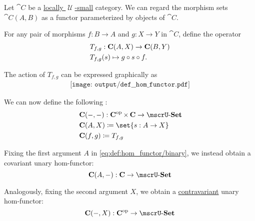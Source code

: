 \begin{definition}\label{def:hom_functor}
  Let \( \cat{C} \) be a \hyperref[def:category_size]{locally \( \mscrU \)-small} category. We can regard the morphism sets \( \cat{C}(A, B) \) as a functor parameterized by objects of \( \cat{C} \).

  \begin{thmenum}
     For any pair of morphisms \( f: B \to A \) and \( g: X \to Y \) in \( \cat{C} \), define the operator
    \begin{equation}\label{eq:def:hom_functor/t}
      \begin{aligned}
        &T_{f,g}: \cat{C}(A, X) \to \cat{C}(B, Y) \\
        &T_{f,g}(s) \mapsto g \bincirc s \bincirc f.
      \end{aligned}
    \end{equation}

    The action of \( T_{f,g} \) can be expressed graphically as
    \begin{equation}\label{eq:def:hom_functor/t_diagram}
      \begin{aligned}
        \texttt{[image: output/def\_\_hom\_functor.pdf]}
      \end{aligned}
    \end{equation}

    We can now define the following :
    \begin{equation}\label{eq:def:hom_functor/binary}
      \begin{aligned}
        &\cat{C}(\anon*, \anon*): \cat{C}^{\opcat} \times \cat{C} \to \ucat{Set} \\
        &\cat{C}(A, X) \coloneqq \set{ s: A \to X } \\
        &\cat{C}(f, g) \coloneqq T_{f,g}
      \end{aligned}
    \end{equation}

     Fixing the first argument \( A \) in \eqref{eq:def:hom_functor/binary}, we instead obtain a covariant unary hom-functor:
    \begin{equation}\label{eq:def:hom_functor/unary/covariant}
      \cat{C}(A, \anon*): \cat{C} \to \ucat{Set}
    \end{equation}

    Analogously, fixing the second argument \( X \), we obtain a \hyperref[def:hom_functor/unary]{contravariant} unary hom-functor:
    \begin{equation}\label{eq:def:hom_functor/unary/contravariant}
      \cat{C}(\anon*, X): \cat{C}^{\opcat} \to \ucat{Set}
    \end{equation}
  \end{thmenum}
\end{definition}

